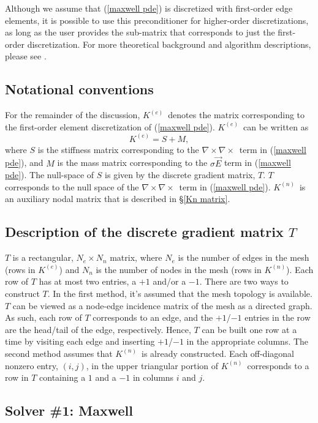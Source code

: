 \documentclass{article}[11pt]
\newcommand \Ke {\ensuremath{K^{(e)}}}
\newcommand \Kn {\ensuremath{K^{(n)}}}
\newcommand \curlcurl {\ensuremath{\nabla\times\nabla\times}}
\begin{document}
Although we assume that (\ref{maxwell pde}) is discretized with
first-order edge elements, it is possible to use this preconditioner for
higher-order discretizations, as long as the user provides the sub-matrix
that corresponds to just the first-order discretization.
For more theoretical background and algorithm descriptions, please see
\cite{HTBGR_2004,BGHRT_2003}.

\subsection{Notational conventions}\label{maxwell notation}
For the remainder of the discussion, \Ke\ denotes the matrix corresponding to
the first-order element discretization of (\ref{maxwell pde}).   \Ke\ can be
written as
$$\Ke = S + M,$$
where $S$ is the stiffness matrix corresponding to the \curlcurl\ term in
(\ref{maxwell pde}), and $M$ is the mass matrix corresponding to the $\sigma\vec{E}$
term in (\ref{maxwell pde}).
The null-space of $S$ is given by the discrete gradient matrix, $T$.
$T$ corresponds to the null space of the \curlcurl\ term in
(\ref{maxwell pde}).
\Kn\ is an auxiliary nodal matrix that is described in \S\ref{Kn matrix}.


\subsection{Description of the discrete gradient matrix $T$}\label{T matrix}
%
$T$ is a rectangular, $N_e\times N_n$ matrix, where $N_e$ is the number of
edges in the mesh (rows in \Ke) and $N_n$ is the number of nodes in the mesh
(rows in \Kn).
Each row of $T$ has at most two entries, a $+1$ and/or a $-1$.
There are two ways to construct $T$.
In the first method, 
it's assumed that the mesh topology is available.
$T$ can be viewed as a node-edge incidence matrix of the mesh as a
directed graph.
As such,
each row of $T$ corresponds to an edge, and the $+1$/$-1$ entries in the
row are the head/tail of the edge, respectively.
Hence, $T$ can be built one row at a time by visiting each edge and inserting
$+1$/$-1$ in the appropriate columns.
The second method assumes that \Kn\ is already constructed.
Each off-diagonal nonzero entry, $(i,j)$, in the upper triangular
portion of \Kn\ corresponds to a row in $T$ containing
a $1$ and a $-1$ in columns $i$ and $j$.



\subsection{Solver \#1: Maxwell}\label{maxwell:maxwell}
\end{document}
